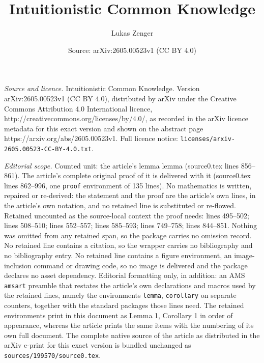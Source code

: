 \documentclass[10pt,a4paper]{amsart}
\title{Intuitionistic Common Knowledge}
\author{Lukas Zenger}
\date{Source: arXiv:2605.00523v1 (CC BY 4.0)}
\begin{document}
\maketitle

\noindent\emph{Source and licence.} Intuitionistic Common Knowledge. Version arXiv:2605.00523v1 (CC BY 4.0), distributed by arXiv under the Creative Commons Attribution 4.0 International licence, http://creativecommons.org/licenses/by/4.0/, as recorded in the arXiv licence metadata for this exact version and shown on the abstract page https://arxiv.org/abs/2605.00523v1. Full licence notice: \texttt{licenses/arxiv-2605.00523-CC-BY-4.0.txt}.\par\smallskip

\noindent\textit{Editorial scope.} Counted unit: the article's lemma lemma (source0.tex lines 856--861). The article's complete original proof of it is delivered with it (source0.tex lines 862--996, one \texttt{proof} environment of 135 lines). No mathematics is written, repaired or re-derived: the statement and the proof are the article's own lines, in the article's own notation, and no retained line is substituted or re-flowed.  Retained uncounted as the source-local context the proof needs: lines 495--502; lines 508--510; lines 552--557; lines 585--593; lines 749--758; lines 844--851.  Nothing was omitted from any retained span, so the package carries no omission record.  No retained line contains a citation, so the wrapper carries no bibliography and no bibliography entry.  No retained line contains a figure environment, an image-inclusion command or drawing code, so no image is delivered and the package declares no asset dependency.  Editorial formatting only, in addition: an AMS \texttt{amsart} preamble that restates the article's own declarations and macros used by the retained lines, namely the environments \texttt{lemma}, \texttt{corollary} on separate counters, together with the standard packages those lines need.  The retained environments print in this document as Lemma 1, Corollary 1 in order of appearance, whereas the article prints the same items with the numbering of its own full document.  The complete native source of the article as distributed in the arXiv e-print for this exact version is bundled unchanged as \texttt{sources/199570/source0.tex}.
\end{document}
